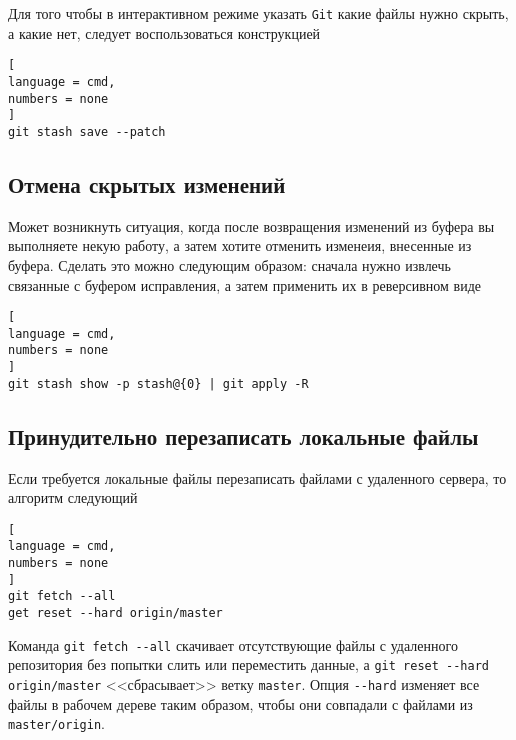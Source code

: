 \documentclass[%
	11pt,
	a4paper,
	utf8,
		]{article}
\begin{document}
Для того чтобы в интерактивном режиме указать \texttt{Git} какие файлы нужно скрыть, а какие нет, следует воспользоваться конструкцией

\begin{lstlisting}[
language = cmd,
numbers = none
]
git stash save --patch
\end{lstlisting}


\subsection{Отмена скрытых изменений}

Может возникнуть ситуация, когда после возвращения изменений из буфера вы выполняете некую работу, а затем хотите отменить изменеия, внесенные из буфера. Сделать это можно следующим образом: сначала нужно извлечь связанные с буфером исправления, а затем применить их в реверсивном виде

\begin{lstlisting}[
language = cmd,
numbers = none
]
git stash show -p stash@{0} | git apply -R
\end{lstlisting}




\subsection{Принудительно перезаписать локальные файлы}

Если требуется локальные файлы перезаписать файлами с удаленного сервера, то алгоритм следующий

\begin{lstlisting}[
language = cmd,
numbers = none
]
git fetch --all
get reset --hard origin/master
\end{lstlisting}

Команда \lstinline{git fetch --all} скачивает отсутствующие файлы с удаленного репозитория без попытки слить или переместить данные, а \lstinline{git reset --hard origin/master} <<сбрасывает>> ветку \texttt{master}. Опция \lstinline{--hard} изменяет все файлы в рабочем дереве таким образом, чтобы они совпадали с файлами из \texttt{master/origin}.
\end{document}
